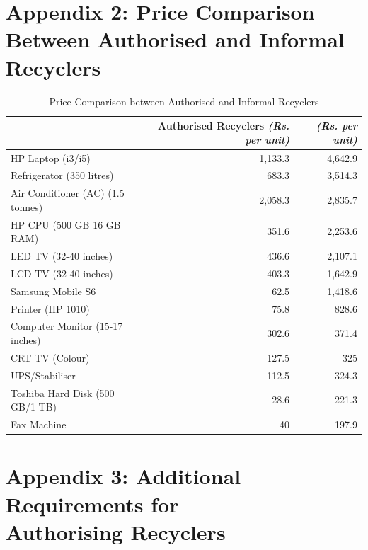 \documentclass[a4paper, 12pt]{article}
\begin{document}
        \section*{Appendix 2: Price Comparison Between Authorised and Informal Recyclers}
\begin{table}[htpb]
\raggedright
\caption{Price Comparison between Authorised and Informal Recyclers}
\begin{tabular}{ l  r  r }
 \multicolumn{1}{p{7em}}{\centering{Item}} & \multicolumn{1}{p{10em}}{Authorised Recyclers \raggedleft\footnotesize\textit{(Rs. per unit)}} & \multicolumn{1}{p{9.5em}}{\centering{Informal Recyclers} \raggedleft\footnotesize\textit{(Rs. per unit)}} \\
\hline

HP Laptop (i3/i5) & 1,133.3 & 4,642.9\\
Refrigerator (350 litres) & 683.3 & 3,514.3 \\
Air Conditioner (AC) (1.5 tonnes) & 2,058.3 & 2,835.7 \\
HP CPU (500 GB 16 GB RAM) & 351.6  & 2,253.6 \\
LED TV (32-40 inches) & 436.6 & 2,107.1 \\
LCD TV (32-40 inches) & 403.3 & 1,642.9 \\
Samsung Mobile S6 & 62.5 & 1,418.6 \\
Printer (HP 1010) & 75.8 & 828.6 \\
Computer Monitor (15-17 inches) & 302.6 & 371.4\\
CRT TV (Colour) & 127.5 & 325 \\
UPS/Stabiliser & 112.5 & 324.3 \\
Toshiba Hard Disk (500 GB/1 TB) & 28.6 & 221.3 \\
Fax Machine & 40  & 197.9 \\ 

\end{tabular}
\end{table}

        \newpage
             \section*{Appendix 3: Additional Requirements for \\ Authorising Recyclers}
        
\end{document}
